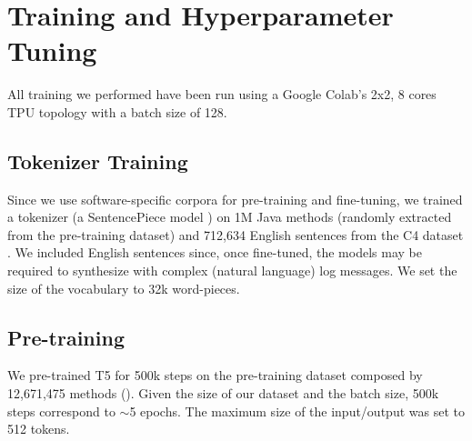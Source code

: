 \section{Training and Hyperparameter Tuning} \label{sec:training}
All training we performed have been run using a Google Colab's 2x2, 8 cores TPU topology with a batch size of 128.

\subsection{Tokenizer Training}
Since we use software-specific corpora for pre-training and fine-tuning, we trained a tokenizer (\ie a SentencePiece model \cite{kudo2018sentencepiece}) on 1M Java methods (randomly extracted from the pre-training dataset) and 712,634 English sentences from the C4 dataset \cite{raffel2019exploring}. We included English sentences since, once fine-tuned, the models may be required to synthesize with complex (natural language) log messages. We set the size of the vocabulary to 32k word-pieces. 

\subsection{Pre-training}
We pre-trained T5 for 500k steps on the pre-training dataset composed by 12,671,475 \java methods (). Given the size of our dataset and the batch size, 500k steps correspond to $\sim$5 epochs. The maximum size of the input/output was set to 512 tokens.

